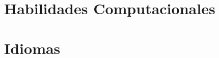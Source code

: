 \documentclass[10pt,a4paper]{moderncv}
\begin{document}

\section{Habilidades Computacionales}

\section{Idiomas}
\end{document}
